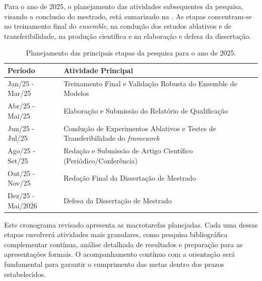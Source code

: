 Para o ano de 2025, o planejamento das atividades subsequentes da pesquisa, visando a conclusão do mestrado, está sumarizado na . As etapas concentram-se no treinamento final do \textit{ensemble}, na condução dos estudos ablativos e de transferibilidade, na produção científica e na elaboração e defesa da dissertação.

\begin{table}[!htb] %
\centering
\caption[Cronograma das atividades planejadas para 2025.]{Planejamento das principais etapas da pesquisa para o ano de 2025.}
\label{tab:cronograma_2025_revisado} %
\begin{tabular}{l p{}} %
\toprule
\textbf{Período} & \textbf{Atividade Principal} \\ 
\midrule
Jan/25 - Mar/25 & Treinamento Final e Validação Robusta do Ensemble de Modelos \\
Abr/25 - Mai/25 & Elaboração e Submissão do Relatório de Qualificação \\
Jun/25 - Jul/25 & Condução de Experimentos Ablativos e Testes de Transferibilidade do \textit{framework} \\
Ago/25 - Set/25 & Redação e Submissão de Artigo Científico (Periódico/Conferência) \\
Out/25 - Nov/25 & Redação Final da Dissertação de Mestrado \\
Dez/25 - Mai/2026         & Defesa da Dissertação de Mestrado \\ 
\bottomrule
\end{tabular}
\end{table}

Este cronograma revisado apresenta as macrotarefas planejadas. Cada uma dessas etapas envolverá atividades mais granulares, como pesquisa bibliográfica complementar contínua, análise detalhada de resultados e preparação para as apresentações formais. O acompanhamento contínuo com a orientação será fundamental para garantir o cumprimento das metas dentro dos prazos estabelecidos.